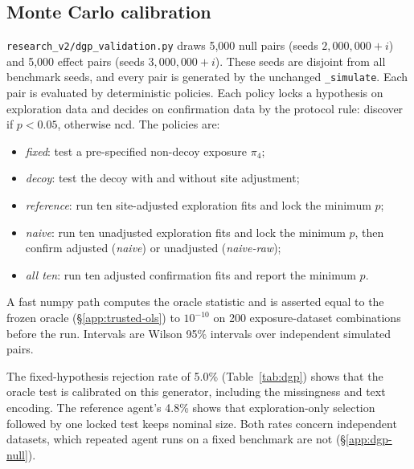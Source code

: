 \subsection{Monte Carlo calibration}
\label{app:dgp-mc}
\texttt{research\_v2/dgp\_validation.py} draws 5,000 null pairs (seeds
$2{,}000{,}000+i$) and 5,000 effect pairs (seeds $3{,}000{,}000+i$). These
seeds are disjoint from all benchmark seeds, and every pair is generated by
the unchanged \texttt{\_simulate}. Each pair is evaluated by deterministic
policies. Each policy locks a hypothesis on exploration data and decides on
confirmation data by the protocol rule: discover if $p<0.05$, otherwise ncd.
The policies are:
\begin{itemize}
\item \emph{fixed}: test a pre-specified non-decoy exposure $\pi_4$;
\item \emph{decoy}: test the decoy with and without site adjustment;
\item \emph{reference}: run ten site-adjusted exploration fits and lock the
minimum $p$;
\item \emph{naive}: run ten unadjusted exploration fits and lock the minimum
$p$, then confirm adjusted (\emph{naive}) or unadjusted (\emph{naive-raw});
\item \emph{all ten}: run ten adjusted confirmation fits and report the
minimum $p$.
\end{itemize}
A fast numpy path computes the oracle statistic and is asserted equal to the
frozen oracle (\S\ref{app:trusted-ols}) to $10^{-10}$ on 200 exposure-dataset
combinations before the run. Intervals are Wilson 95\% intervals over
independent simulated pairs.

The fixed-hypothesis rejection rate of 5.0\% (Table~\ref{tab:dgp}) shows that
the oracle test is calibrated on this generator, including the missingness and
text encoding. The reference agent's 4.8\% shows that exploration-only
selection followed by one locked test keeps nominal size. Both rates concern
independent datasets, which repeated agent runs on a fixed benchmark are not
(\S\ref{app:dgp-null}).

